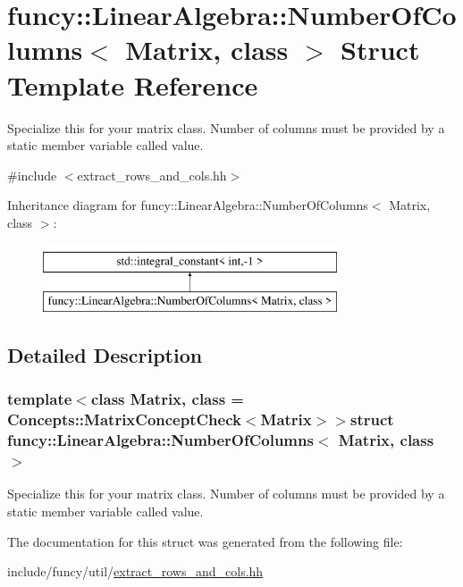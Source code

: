 \hypertarget{structfuncy_1_1LinearAlgebra_1_1NumberOfColumns}{\section{funcy\-:\-:Linear\-Algebra\-:\-:Number\-Of\-Columns$<$ Matrix, class $>$ Struct Template Reference}
\label{structfuncy_1_1LinearAlgebra_1_1NumberOfColumns}
}


Specialize this for your matrix class. Number of columns must be provided by a static member variable called value.  




{\ttfamily \#include $<$extract\-\_\-rows\-\_\-and\-\_\-cols.\-hh$>$}

Inheritance diagram for funcy\-:\-:Linear\-Algebra\-:\-:Number\-Of\-Columns$<$ Matrix, class $>$\-:\begin{figure}[H]
\begin{center}
\leavevmode
\includegraphics[height=2.000000cm]{structfuncy_1_1LinearAlgebra_1_1NumberOfColumns}
\end{center}
\end{figure}


\subsection{Detailed Description}
\subsubsection*{template$<$class Matrix, class = Concepts\-::\-Matrix\-Concept\-Check$<$\-Matrix$>$$>$struct funcy\-::\-Linear\-Algebra\-::\-Number\-Of\-Columns$<$ Matrix, class $>$}

Specialize this for your matrix class. Number of columns must be provided by a static member variable called value. 

The documentation for this struct was generated from the following file\-:\begin{DoxyCompactItemize}
\item 
include/funcy/util/\hyperlink{extract__rows__and__cols_8hh}{extract\-\_\-rows\-\_\-and\-\_\-cols.\-hh}\end{DoxyCompactItemize}
